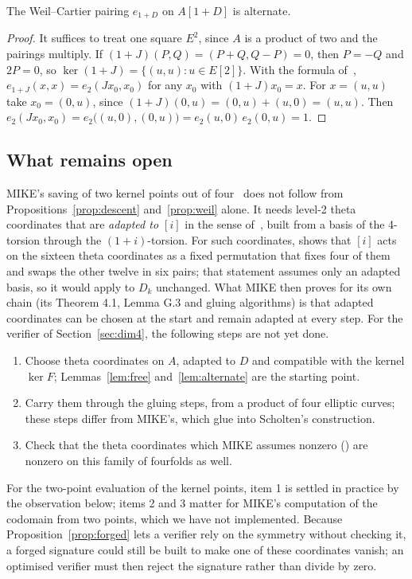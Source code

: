 \begin{lemma}
    \label{lem:alternate}
    The Weil--Cartier pairing $e_{1+D}$ on $A[1 + D]$ is alternate.
\end{lemma}

\begin{proof}
    It suffices to treat one square $E^2$, since $A$ is a product of two
    and the pairings multiply. If $(1 + J)(P, Q) = (P + Q, Q - P) = 0$, then
    $P = -Q$ and $2P = 0$, so $\ker(1 + J) = \{(u, u) : u \in E[2]\}$. With
    the formula of~\cite[proof of Corollary G.1]{BDD+26},
    $e_{1+J}(x, x) = e_2(J x_0, x_0)$ for any $x_0$ with $(1 + J) x_0 = x$.
    For $x = (u, u)$ take $x_0 = (0, u)$, since $(1 + J)(0, u) = (0, u) +
    (u, 0) = (u, u)$. Then $e_2(J x_0, x_0) = e_2\bigl((u, 0), (0, u)\bigr) =
    e_2(u, 0)\, e_2(0, u) = 1$.
\end{proof}

\subsection{What remains open}

MIKE's saving of two kernel points out of four~\cite[Theorem
E.1]{BDD+26} does not follow from Propositions~\ref{prop:descent}
and~\ref{prop:weil} alone. It needs level-2 theta coordinates that are
\emph{adapted to $[i]$} in the sense of~\cite[Definition G.1]{BDD+26},
built from a basis of the 4-torsion through the $(1 + i)$-torsion. For
such coordinates, \cite[Proposition G.3]{BDD+26} shows that $[i]$ acts on
the sixteen theta coordinates as a fixed permutation that fixes four of
them and swaps the other twelve in six pairs; that statement assumes only
an adapted basis, so it would apply to $D_k$ unchanged. What MIKE then
proves for its own chain (its Theorem 4.1, Lemma G.3 and gluing
algorithms) is that adapted coordinates can be chosen at the start and
remain adapted at every step. For the verifier of
Section~\ref{sec:dim4}, the following steps are not yet done.
\begin{enumerate}
    \item Choose theta coordinates on $A$, adapted to $D$ and compatible
    with the kernel $\ker F$; Lemmas~\ref{lem:free}
    and~\ref{lem:alternate} are the starting point.
    \item Carry them through the gluing steps, from a product of four
    elliptic curves; these steps differ from MIKE's, which glue into
    Scholten's construction.
    \item Check that the theta coordinates which MIKE assumes nonzero
    (\cite[Heuristic E.1]{BDD+26}) are nonzero on this family of
    fourfolds as well.
\end{enumerate}
For the two-point evaluation of the kernel points, item 1 is settled in
practice by the observation below; items 2 and 3 matter for MIKE's
computation of the codomain from two points, which we have not
implemented.
Because Proposition~\ref{prop:forged} lets a verifier rely on the symmetry
without checking it, a forged signature could still be built to make one
of these coordinates vanish; an optimised verifier must then reject the
signature rather than divide by zero.

